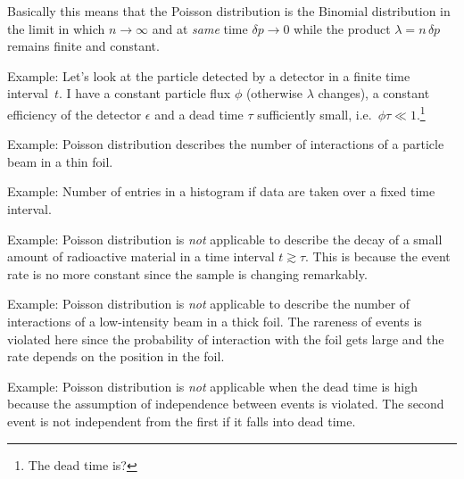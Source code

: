 Basically this means that the Poisson distribution is the Binomial distribution in the limit in which $n\to\infty$ and at \emph{same} time $\delta p \to 0$ while the product $\lambda = n\,\delta p$ remains finite and constant.


Example: 
Let's look at the particle detected by a detector in a finite time interval~$t$.
I have a constant particle flux $\phi$ (otherwise $\lambda$ changes), a constant efficiency of the detector $\epsilon$ and a dead time $\tau$ sufficiently small, i.e.~$\phi\tau\ll1$.\footnote{The dead time is?}

Example:
Poisson distribution describes the number of interactions of a particle beam in a thin foil.

Example:
Number of entries in a histogram if data are taken over a fixed time interval.

Example:
Poisson distribution is \emph{not} applicable to describe the decay of  a small amount of radioactive material in a time interval $t \gtrsim \tau$.
This is because the event rate is no more constant since the sample is changing remarkably.

Example:
Poisson distribution is \emph{not} applicable to describe the number of interactions of a low-intensity beam in a thick foil.
The rareness of events is violated here since the probability of interaction with the foil gets large and the rate depends on the position in the foil.

Example:
Poisson distribution is \emph{not} applicable when the dead time is high because the assumption of independence between events is violated.
The second event is not independent from the first if it falls into dead time.
